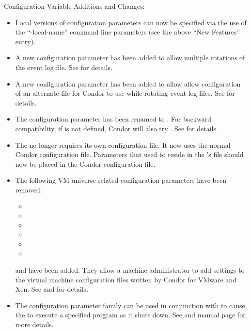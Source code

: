 \noindent Configuration Variable Additions and Changes:

\begin{itemize}

\item Local versions of configuration parameters can now be specified
  via the use of the ``-local-name'' command line parameters (see the
  above ``New Features'' entry).

\item A new configuration parameter
   has been added to allow
  multiple rotations of the event log file.
  See \pageref{param:EventLogMaxRotations} for details.

\item A new configuration parameter
   has been added to allow
  allow configuration of an alternate file for Condor to use while
  rotating event log files.
  See \pageref{param:EventLogRotationLock} for details.

\item The configuration parameter  has been
  renamed to .  For backward
  compatibility, if  is not defined,
  Condor will also try .
  See \pageref{param:EventLogMaxSize} for details.

\item The  no longer requires its own configuration
  file. It now uses the normal Condor configuration file. Parameters
  that used to reside in the 's file should now be placed
  in the Condor configuration file.

\item The following VM universe-related configuration parameters have
  been removed:
  \begin{itemize}
  \item {}
  \item {}
  \item {}
  \item {}
  \item {}
  \item {}
  \end{itemize}

  and  have been added. They allow
  a machine administrator to add settings to the virtual machine
  configuration files written by Condor for VMware and Xen.
  See \pageref{param:VMwareLocalSettingsFile} and
  \pageref{param:XenLocalSettingsFile} for details.

\item The configuration parameter family
   can be used in conjunction
  with  to cause the  to execute
  a specified program as it shuts down.  See
  \pageref{param:MasterShutdownProgram} and 
  manual page for more details.

\end{itemize}
